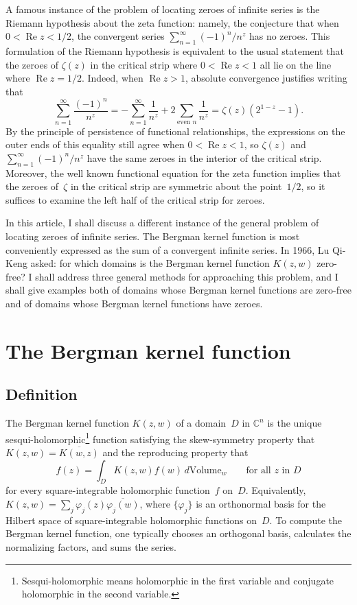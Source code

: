 \documentclass[12pt]{amsart}
\theoremstyle{definition}
\newcommand{\C}{\mathbb{C}}
\DeclareMathOperator{\re}{Re}
\begin{document}
A famous instance of the problem of locating zeroes of infinite
series is the Riemann hypothesis about the zeta function: namely,
the conjecture that when \(0<\re z<1/2\), the convergent series
\(\sum_{n=1}^\infty (-1)^n/n^z\) has no zeroes. This formulation
of the Riemann hypothesis is equivalent to the usual statement
that the zeroes of \(\zeta(z)\) in the critical strip where
\(0<\re z<1\) all lie on the line where \(\re z=1/2\). Indeed,
when \(\re z>1\), absolute convergence justifies writing that
\begin{equation*}
\sum_{n=1}^\infty \frac{(-1)^n}{n^z} = -\sum_{n=1}^\infty
\frac{1}{n^z} +2\sum_{\text{even \(n\)}}\frac{1}{n^z}
=\zeta(z)(2^{1-z}-1).
\end{equation*}
By the principle of persistence of functional relationships, the
expressions on the outer ends of this equality still agree when
\(0<\re z<1\), so \(\zeta(z)\) and \(\sum_{n=1}^\infty
(-1)^n/n^z\) have the same zeroes in the interior of the critical
strip. Moreover, the well known functional equation for the zeta
function implies that the zeroes of~\(\zeta\) in the critical
strip are symmetric about the point~\(1/2\), so it suffices to
examine the left half of the critical strip for zeroes.

In this article, I shall discuss a different instance of the
general problem of locating zeroes of infinite series.  The
Bergman kernel function is most conveniently expressed as the sum
of a convergent infinite series.  In 1966, Lu Qi-Keng \cite{lu}
asked: for which domains is the Bergman kernel function
\(K(z,w)\) zero-free? I shall address three general methods for
approaching this problem, and I shall give examples both of
domains whose Bergman kernel functions are zero-free and of
domains whose Bergman kernel functions have zeroes.

\section{The Bergman kernel function}
\subsection{Definition}
The Bergman kernel function \(K(z,w)\) of a domain~\(D\) in
\(\C^n\) is the unique
sesqui-holomorphic\footnote{Sesqui-holomorphic means holomorphic
  in the first variable and conjugate holomorphic in the second
  variable.} function satisfying the skew-symmetry property that
\(K(z,w)=\overline {K(w,z)}\) and the reproducing property that
\begin{equation*}
f(z)=\int_D K(z,w) f(w) \,d\text{Volume}_w  \qquad \text{for all
  $z$ in $D$}
\end{equation*}
for every square-integrable holomorphic function~\(f\) on~\(D\).
Equivalently, \(K(z,w)=\sum_j
\varphi_j(z)\overline{\varphi_j(w)}\), where \(\{\varphi_j\}\) is
an orthonormal basis for the Hilbert space of square-integrable
holomorphic functions on~\(D\). To compute the Bergman kernel
function, one typically chooses an orthogonal basis, calculates
the normalizing factors, and sums the series.
\end{document}
